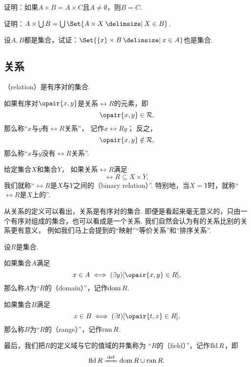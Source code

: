 \begin{example}
证明：如果\(A \times B = A \times C\)且\(A \neq \emptyset\)，则\(B = C\).
\end{example}

\begin{example}
证明：\(A \times \bigcup B = \bigcup\Set{ A \times X \given X \in B }\).
\end{example}

\begin{example}
设\(A,B\)都是集合，试证：\(\Set{ \{x\} \times B \given x \in A }\)也是集合.
\end{example}

\subsection{关系}
\begin{definition}
（relation）是有序对的集合.
\end{definition}

如果有序对\(\opair{x,y}\)是关系\(\rel{R}\)的元素，即\[
	\opair{x,y} \in \rel{R},
\]
那么称“\(x\)与\(y\)有\(\rel{R}\)关系”，
记作\(x\rel{R}y\)；
反之，\[
	\opair{x,y} \notin \rel{R},
\]
那么称“\(x\)与\(y\)没有\(\rel{R}\)关系”.

给定集合\(X\)和集合\(Y\)，
如果关系\(\rel{R}\)满足\[
	\rel{R} \subseteq X \times Y,
\]
我们就称“\(\rel{R}\)是\(X\)与\(Y\)之间的（binary relation）”.
特别地，当\(X = Y\)时，就称“\(\rel{R}\)是\(X\)上的”.

从关系的定义可以看出，关系是有序对的集合.
即便是看起来毫无意义的，只由一个有序对组成的集合，也可以看成是一个关系.
我们自然会认为有的关系比别的关系更有意义，
例如我们马上会提到的“映射”“等价关系”和“排序关系”.

\begin{definition}\label{definition:集合论.定义域与值域的定义}
设\(R\)是集合.

如果集合\(A\)满足\[
	x \in A \iff (\exists y)[\opair{x,y} \in R],
\]
那么称\(A\)为“\(R\)的（domain）”，记作\(\operatorname{dom} R\).

如果集合\(B\)满足\[
	x \in B \iff (\exists t)[\opair{t,x} \in R],
\]
那么称\(B\)为“\(R\)的（range）”，记作\(\operatorname{ran} R\).

最后，我们把\(R\)的定义域与它的值域的并集称为
“\(R\)的（field）”，记作\(\operatorname{fld} R\)，即\[
	\fld R \defeq \dom R \cup \ran R.
\]
\end{definition}

